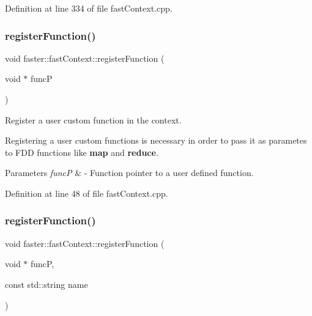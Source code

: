 Definition at line 334 of file fast\+Context.\+cpp.

\hypertarget{classfaster_1_1fastContext_a78d8eec46a44c600adb554bcdf8d8a2c}{}\label{classfaster_1_1fastContext_a78d8eec46a44c600adb554bcdf8d8a2c} 
\subsubsection{\texorpdfstring{register\+Function()}{registerFunction()}\hspace{0.1cm}{\footnotesize\ttfamily [1/2]}}
{\footnotesize\ttfamily void faster\+::fast\+Context\+::register\+Function (\begin{DoxyParamCaption}\item[{void $\ast$}]{funcP }\end{DoxyParamCaption})}



Register a user custom function in the context. 

Registering a user custom functions is necessary in order to pass it as parametes to F\+DD functions like {\bfseries map} and {\bfseries reduce}.


\begin{DoxyParams}{Parameters}
{\em funcP} & -\/ Function pointer to a user defined function. \\
\hline
\end{DoxyParams}


Definition at line 48 of file fast\+Context.\+cpp.

\hypertarget{classfaster_1_1fastContext_add296b9632bef0f4ceddbdc02a874bb4}{}\label{classfaster_1_1fastContext_add296b9632bef0f4ceddbdc02a874bb4} 
\subsubsection{\texorpdfstring{register\+Function()}{registerFunction()}\hspace{0.1cm}{\footnotesize\ttfamily [2/2]}}
{\footnotesize\ttfamily void faster\+::fast\+Context\+::register\+Function (\begin{DoxyParamCaption}\item[{void $\ast$}]{funcP,  }\item[{const std\+::string}]{name }\end{DoxyParamCaption})}



